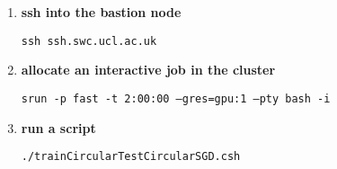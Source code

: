 \documentclass[12pt]{article}
\begin{document}
\begin{enumerate}

    \item \textbf{ssh into the bastion node}

        \texttt{ssh ssh.swc.ucl.ac.uk}

    \item \textbf{allocate an interactive job in the cluster}

        \texttt{srun -p fast -t 2:00:00 --gres=gpu:1 --pty bash -i}

    \item \textbf{run a script}

        \texttt{./trainCircularTestCircularSGD.csh}

\end{enumerate}
\end{document}
